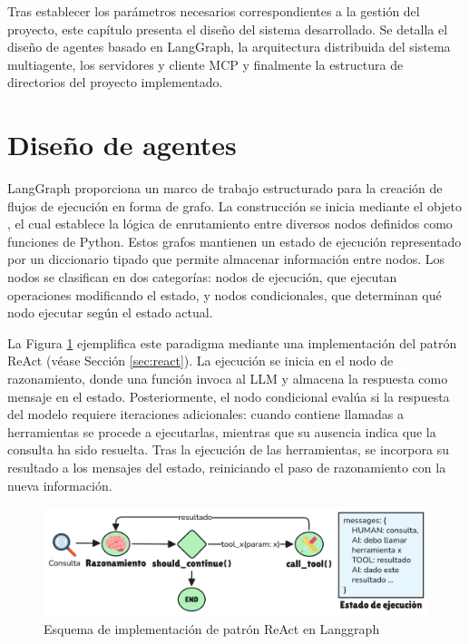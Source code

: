 Tras establecer los parámetros necesarios correspondientes a la gestión del proyecto, este capítulo presenta el diseño del sistema desarrollado. Se detalla el diseño de agentes basado en LangGraph, la arquitectura distribuida del sistema multiagente, los servidores y cliente MCP y finalmente la estructura de directorios del proyecto implementado.

\section{Diseño de agentes}
LangGraph proporciona un marco de trabajo estructurado para la creación de flujos de ejecución en forma de grafo. La construcción se inicia mediante el objeto , el cual establece la lógica de enrutamiento entre diversos nodos definidos como funciones de Python. Estos grafos mantienen un estado de ejecución representado por un diccionario tipado que permite almacenar información entre nodos. Los nodos se clasifican en dos categorías: nodos de ejecución, que ejecutan operaciones modificando el estado, y nodos condicionales, que determinan qué nodo ejecutar según el estado actual.

La Figura \ref{fig:react} ejemplifica este paradigma mediante una implementación del patrón ReAct (véase Sección \ref{sec:react}). La ejecución se inicia en el nodo de razonamiento, donde una función invoca al LLM y almacena la respuesta como mensaje en el estado. Posteriormente, el nodo condicional  evalúa si la respuesta del modelo requiere iteraciones adicionales: cuando contiene llamadas a herramientas se procede a ejecutarlas, mientras que su ausencia indica que la consulta ha sido resuelta. Tras la ejecución de las herramientas, se incorpora su resultado a los mensajes del estado, reiniciando el paso de razonamiento con la nueva información.

\begin{figure}[hbtp]
  \centering
  \includegraphics[scale=0.2]{figures/react.png}
  \caption{Esquema de implementación de patrón ReAct en Langgraph}
  \label{fig:react}
\end{figure}

